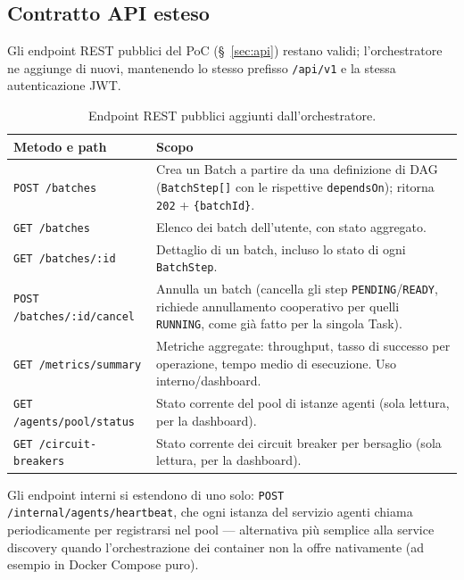 \documentclass[11pt,a4paper]{article}
\begin{document}
\subsection{Contratto API esteso}

Gli endpoint REST pubblici del PoC (\S~\ref{sec:api}) restano validi; l'orchestratore ne aggiunge di nuovi, mantenendo lo stesso prefisso \texttt{/api/v1} e la stessa autenticazione JWT.

\begin{table}[H]
\centering
\caption{Endpoint REST pubblici aggiunti dall'orchestratore.}
\label{tab:orch-endpoint}
\vspace{2mm}
\renewcommand{\arraystretch}{1.3}
\begin{tabularx}{\textwidth}{|l|X|}
\hline
\textbf{Metodo e path} & \textbf{Scopo} \\ \hline
\texttt{POST /batches} & Crea un Batch a partire da una definizione di DAG (\texttt{BatchStep[]} con le rispettive \texttt{dependsOn}); ritorna \texttt{202} + \texttt{\{batchId\}}. \\ \hline
\texttt{GET /batches} & Elenco dei batch dell'utente, con stato aggregato. \\ \hline
\texttt{GET /batches/:id} & Dettaglio di un batch, incluso lo stato di ogni \texttt{BatchStep}. \\ \hline
\texttt{POST /batches/:id/cancel} & Annulla un batch (cancella gli step \texttt{PENDING}/\texttt{READY}, richiede annullamento cooperativo per quelli \texttt{RUNNING}, come già fatto per la singola Task). \\ \hline
\texttt{GET /metrics/summary} & Metriche aggregate: throughput, tasso di successo per operazione, tempo medio di esecuzione. Uso interno/dashboard. \\ \hline
\texttt{GET /agents/pool/status} & Stato corrente del pool di istanze agenti (sola lettura, per la dashboard). \\ \hline
\texttt{GET /circuit-breakers} & Stato corrente dei circuit breaker per bersaglio (sola lettura, per la dashboard). \\ \hline
\end{tabularx}
\end{table}

Gli endpoint interni si estendono di uno solo: \texttt{POST /internal/agents/heartbeat}, che ogni istanza del servizio agenti chiama periodicamente per registrarsi nel pool --- alternativa più semplice alla service discovery quando l'orchestrazione dei container non la offre nativamente (ad esempio in Docker Compose puro).
\end{document}

